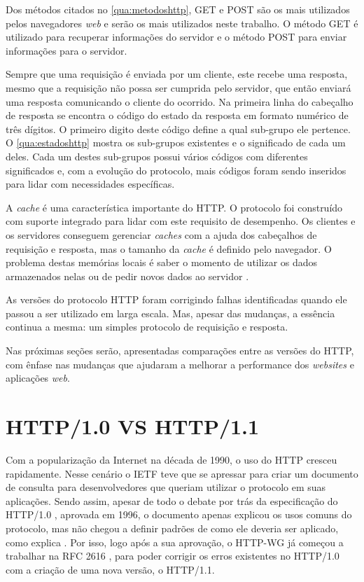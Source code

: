 

Dos métodos citados no \autoref{qua:metodoshttp}, GET e POST são os mais utilizados pelos navegadores \textit{web} e serão os mais utilizados neste trabalho. O método GET é utilizado para recuperar informações do servidor e o método POST para enviar informações para o servidor.

Sempre que uma requisição é enviada por um cliente, este recebe uma resposta, mesmo que a requisição não possa ser cumprida pelo servidor, que então enviará uma resposta comunicando o cliente do ocorrido. Na primeira linha do cabeçalho de resposta se encontra o código do estado da resposta em formato numérico de três dígitos. O primeiro digito deste código define a qual sub-grupo ele pertence. O \autoref{qua:estadoshttp} mostra os sub-grupos existentes e o significado de cada um deles. Cada um destes sub-grupos possui vários códigos  com diferentes significados e, com a evolução do protocolo, mais códigos foram sendo inseridos para lidar com necessidades específicas.



A \textit{cache} é uma característica importante do HTTP. O protocolo foi construído com suporte integrado para lidar com este requisito de desempenho. Os clientes e os servidores conseguem gerenciar \textit{caches} com a ajuda dos cabeçalhos de requisição e resposta, mas o tamanho da \textit{cache} é definido pelo navegador. O problema destas memórias locais é saber o momento de utilizar os dados armazenados nelas ou de pedir novos dados ao servidor \cite{Tanenbaum}.

As versões do protocolo HTTP foram corrigindo falhas identificadas quando ele passou a ser utilizado em larga escala. Mas, apesar das mudanças, a essência continua a mesma: um simples protocolo de requisição e resposta.

Nas próximas seções serão, apresentadas comparações entre as versões do HTTP, com ênfase nas mudanças que ajudaram a melhorar a performance dos \textit{websites} e aplicações \textit{web}.

\section{HTTP/1.0 VS HTTP/1.1}
\label{sec:http_10_vs_http_11}

Com a popularização da Internet na década de 1990, o uso do HTTP cresceu rapidamente. Nesse cenário o IETF teve que se apressar para criar um documento de consulta para desenvolvedores que queriam utilizar o protocolo em suas aplicações. Sendo assim, apesar de todo o debate por trás da especificação do HTTP/1.0 \cite{RFC1945}, aprovada em 1996, o documento apenas explicou os usos comuns do protocolo, mas não chegou a definir padrões de como ele deveria ser aplicado, como explica . Por isso, logo após a sua aprovação, o HTTP-WG já começou a trabalhar na RFC 2616 \cite{RFC2616}, para poder corrigir os erros existentes no HTTP/1.0 com a criação de uma nova versão, o HTTP/1.1.

